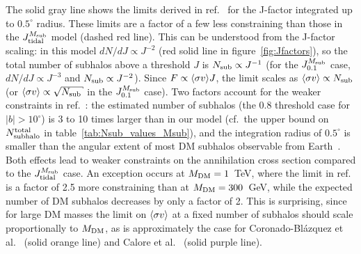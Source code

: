 % 
The solid gray line shows the limits derived in ref.~\cite{2023JCAP...07..033B} for the J-factor integrated up to $0.5^\circ$ radius.
These limits are a factor of a few less constraining than those in the $J_{\rm tidal}^{M_{\rm sub}}$ model (dashed red line).
This can be understood from the J-factor scaling: in this model $dN/dJ \propto J^{-2}$ (red solid line in figure~\ref{fig:Jfactors}), so the total number of subhalos above a threshold $J$ is $N_{\rm sub} \propto J^{-1}$ (for the $J_{0.1}^{M_{\rm sub}}$ case, $dN/dJ \propto J^{-3}$ and $N_{\rm sub} \propto J^{-2}$).
Since $F \propto \langle \sigma v \rangle J$, the limit scales as $\langle \sigma v \rangle \propto N_{\rm sub}$ (or $\sigmav \propto \sqrt{N_{\rm sub}}$ in the $J_{0.1}^{M_{\rm sub}}$ case).
Two factors account for the weaker constraints in ref.~\cite{2023JCAP...07..033B}: the estimated number of subhalos (the 0.8 threshold case for $|b| > 10^\circ$) is 3 to 10 times larger than in our model (cf.\ the upper bound on $N_{\rm subhalo}^{\rm total}$ in table~\ref{tab:Nsub_values_Msub}), and the integration radius of $0.5^\circ$ is smaller than the angular extent of most DM subhalos observable from Earth~\cite{2019JCAP...11..045C, 2024MNRAS.530.2496A}.
Both effects lead to weaker constraints on the annihilation cross section compared to the $J_{\rm tidal}^{M_{\rm sub}}$ case.
An exception occurs at $M_{\rm DM} = 1$~TeV, where the limit in ref.~\cite{2023JCAP...07..033B} is a factor of 2.5 more constraining than at $M_{\rm DM} = 300$~GeV, while the expected number of DM subhalos decreases by only a factor of 2.
This is surprising, since for large DM masses the limit on $\langle \sigma v \rangle$ at a fixed number of subhalos should scale proportionally to $M_{\rm DM}$, as is approximately the case for Coronado-Bl{\'a}zquez et al.~\cite{2019JCAP...11..045C} (solid orange line) and Calore et al.~\cite{2019Galax...7...90C} (solid purple line).

